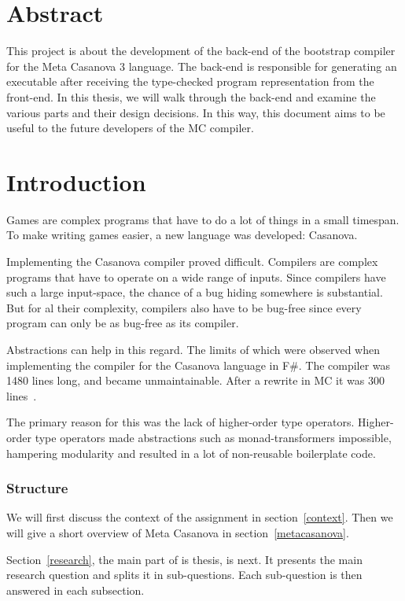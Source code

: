 \section*{Abstract}
This project is about the development of the back-end of the bootstrap compiler for the Meta Casanova 3 language.
The back-end is responsible for generating an executable after receiving the type-checked program representation from the front-end.
In this thesis, we will walk through the back-end and examine the various parts and their design decisions.
In this way, this document aims to be useful to the future developers of the MC compiler.

\section{Introduction}
Games are complex programs that have to do a lot of things in a small timespan.
To make writing games easier, a new language was developed: Casanova.

Implementing the Casanova compiler proved difficult.
Compilers are complex programs that have to operate on a wide range of inputs.
Since compilers have such a large input-space, the chance of a bug hiding somewhere is substantial. 
But for al their complexity, compilers also have to be bug-free since every program can only be as bug-free as its compiler.

Abstractions can help in this regard.
The limits of which were observed when implementing the compiler for the Casanova language in F\#.
The compiler was 1480 lines long, and became unmaintainable.
After a rewrite in MC it was 300 lines~\cite{maggiore}.

The primary reason for this was the lack of higher-order type operators.
Higher-order type operators made abstractions such as monad-transformers impossible, hampering modularity and resulted in a lot of non-reusable boilerplate code.

\subsubsection{Structure}
We will first discuss the context of the assignment in section~\ref{context}.
Then we will give a short overview of Meta Casanova in section~\ref{metacasanova}.

Section~\ref{research}, the main part of is thesis, is next.
It presents the main research question and splits it in sub-questions.
Each sub-question is then answered in each subsection.

